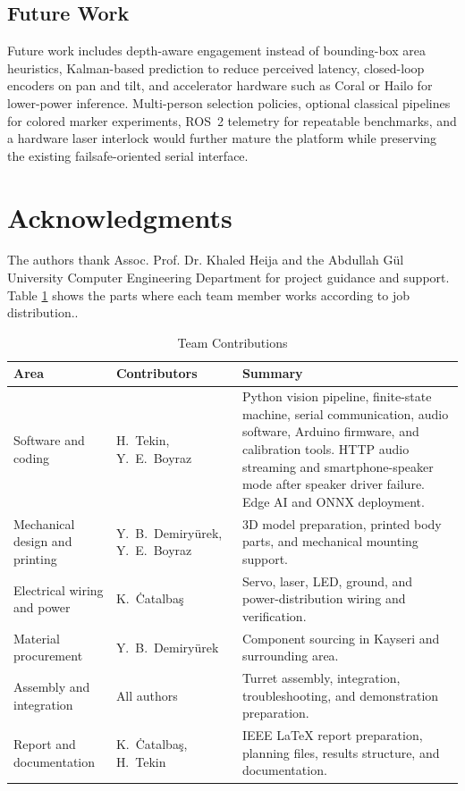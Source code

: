 \documentclass[lettersize,journal]{IEEEtran}
\begin{document}
\subsection{Future Work}
Future work includes depth-aware engagement instead of bounding-box area heuristics, Kalman-based prediction to reduce perceived latency, closed-loop encoders on pan and tilt, and accelerator hardware such as Coral or Hailo for lower-power inference. Multi-person selection policies, optional classical pipelines for colored marker experiments, ROS~2 telemetry for repeatable benchmarks, and a hardware laser interlock would further mature the platform while preserving the existing failsafe-oriented serial interface.

\section*{Acknowledgments}
The authors thank Assoc. Prof. Dr. Khaled Heija and the Abdullah G\"{u}l University Computer Engineering Department for project guidance and support. Table \ref{tab:team} shows the parts where each team member works according to job distribution..

\begin{table}[!t]
\caption{Team Contributions}
\label{tab:team}
\centering
\footnotesize
\renewcommand{\arraystretch}{1.12}
\begin{tabular}{|p{}|p{}|p{}|}
\hline
\textbf{Area} & \textbf{Contributors} & \textbf{Summary}\\
\hline
Software and coding & H.~Tekin, Y.~E.~Boyraz & Python vision pipeline, finite-state machine, serial communication, audio software, Arduino firmware, and calibration tools. HTTP audio streaming and smartphone-speaker mode after speaker driver failure. Edge AI and ONNX deployment.\\
\hline
Mechanical design and printing & Y.~B.~Demiry\"{u}rek, Y.~E.~Boyraz & 3D model preparation, printed body parts, and mechanical mounting support.\\
\hline
Electrical wiring and power & K.~\.{C}atalba\c{s} & Servo, laser, LED, ground, and power-distribution wiring and verification.\\
\hline
Material procurement & Y.~B.~Demiry\"{u}rek & Component sourcing in Kayseri and surrounding area.\\
\hline
Assembly and integration & All authors & Turret assembly, integration, troubleshooting, and demonstration preparation.\\
\hline
Report and documentation & K.~\.{C}atalba\c{s}, H.~Tekin & IEEE LaTeX report preparation, planning files, results structure, and documentation.\\
\hline
\end{tabular}
\end{table}
\end{document}
